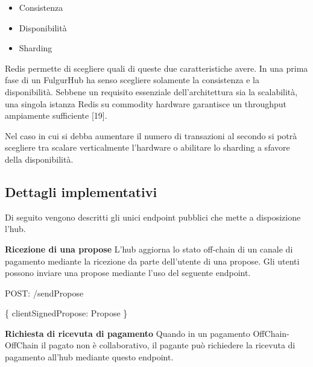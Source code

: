 \documentclass[12pt,italian,]{book}
\newenvironment{Shaded}{}{}
\newcommand{\DataTypeTok}[1]{\textcolor[rgb]{0.56,0.13,0.00}{#1}}
\newcommand{\NormalTok}[1]{#1}
\newcommand{\OperatorTok}[1]{\textcolor[rgb]{0.40,0.40,0.40}{#1}}
\newcommand{\SpecialStringTok}[1]{\textcolor[rgb]{0.73,0.40,0.53}{#1}}
\providecommand{\tightlist}{%
  \setlength{\itemsep}{0pt}\setlength{\parskip}{0pt}}
\begin{document}
\begin{itemize}
\tightlist
\item
  Consistenza
\item
  Disponibilità
\item
  Sharding
\end{itemize}

Redis permette di scegliere quali di queste due caratteristiche avere. In una prima fase di un FulgurHub ha senso scegliere solamente la consistenza e la disponibilità. Sebbene un requisito essenziale dell'architettura sia la scalabilità, una singola istanza Redis su commodity hardware garantisce un throughput ampiamente sufficiente {[}19{]}.

Nel caso in cui si debba aumentare il numero di transazioni al secondo si potrà scegliere tra scalare verticalmente l'hardware o abilitare lo sharding a sfavore della disponibilità.

\hypertarget{dettagli-implementativi-2}{%
\subsection{Dettagli implementativi}\label{dettagli-implementativi-2}}

Di seguito vengono descritti gli unici endpoint pubblici che mette a disposizione l'hub.

\textbf{\textbf{Ricezione di una propose}} L'hub aggiorna lo stato off-chain di un canale di pagamento mediante la ricezione da parte dell'utente di una propose. Gli utenti possono inviare una propose mediante l'uso del seguente endpoint.

\begin{Shaded}
\begin{Highlighting}[]
\NormalTok{POST}\OperatorTok{:} \SpecialStringTok{/sendPropose}
\end{Highlighting}
\end{Shaded}

\begin{Shaded}
\begin{Highlighting}[]
\OperatorTok{\{}
  \DataTypeTok{clientSignedPropose}\OperatorTok{:}\NormalTok{ Propose}
\OperatorTok{\}}
\end{Highlighting}
\end{Shaded}

\textbf{\textbf{Richiesta di ricevuta di pagamento}} Quando in un pagamento OffChain-OffChain il pagato non è collaborativo, il pagante può richiedere la ricevuta di pagamento all'hub mediante questo endpoint.
\end{document}

